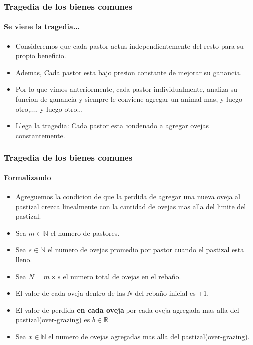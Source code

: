 \documentclass{beamer}
\begin{document}
\begin{frame}
  \frametitle{Tragedia de los bienes comunes}
  \framesubtitle{Se viene la tragedia...}
  \begin{itemize}
    \setlength{\itemsep}{4pt}
    \item Consideremos que cada pastor actua independientemente del resto para su propio beneficio.
    \pause
    \item Ademas, Cada pastor esta bajo presion constante de mejorar su ganancia.
    \pause 
    \item Por lo que vimos anteriormente, cada pastor individualmente, analiza su funcion de ganancia y siempre le conviene agregar un animal mas, y luego otro,..., y luego otro...
    \pause
    \item Llega la tragedia: Cada pastor esta condenado a agregar ovejas constantemente.
  \end{itemize}
\end{frame}

\begin{frame}
  \frametitle{Tragedia de los bienes comunes}
  \framesubtitle{Formalizando}
  \begin{itemize}
    \setlength{\itemsep}{4pt}
    \item Agreguemos la condicion de que la perdida de agregar una nueva oveja al pastizal crezca linealmente con la cantidad de ovejas mas alla del limite del pastizal.
    \pause
    \item Sea $m \in \mathbb{N}$ el numero de pastores. 
    \pause 
    \item Sea $s \in \mathbb{N}$ el numero de ovejas promedio por pastor cuando el pastizal esta lleno. 
    \pause
    \item Sea $N = m \times s$ el numero total de ovejas en el rebaño.
    \pause
    \item El valor de cada oveja dentro de las $N$ del rebaño inicial es +1.
    \pause
    \item El valor de perdida \textbf{en cada oveja} por cada oveja agregada mas alla del pastizal(over-grazing) es $b \in \mathbb{R}$    
    \pause
    \item Sea $x \in \mathbb{N}$ el numero de ovejas agregadas mas alla del pastizal(over-grazing).
  \end{itemize}
\end{frame}
\end{document}
